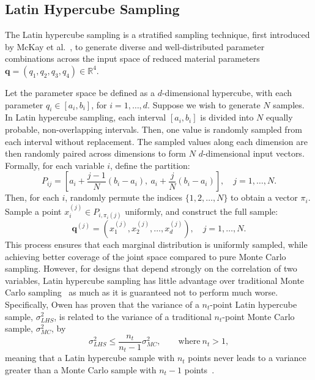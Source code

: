 \documentclass[a4paper,11pt]{article}
\begin{document}
\subsection{Latin Hypercube Sampling}
The Latin hypercube sampling is a stratified sampling technique, first introduced by McKay et al.~\cite{McKay}, to generate diverse and well-distributed parameter combinations across the input space of reduced material parameters $\mathbf{q} = (q_1, q_2, q_3, q_4) \in \mathbb{R}^4$.

Let the parameter space be defined as a $d$-dimensional hypercube, with each parameter \( q_i \in [a_i, b_i] \), for \( i = 1, \ldots, d \). Suppose we wish to generate \( N \) samples. In Latin hypercube sampling, each interval \([a_i, b_i]\) is divided into \( N \) equally probable, non-overlapping intervals. Then, one value is randomly sampled from each interval without replacement. The sampled values along each dimension are then randomly paired across dimensions to form \( N \) $d$-dimensional input vectors. Formally, for each variable \( i \), define the partition:
\begin{equation}
P_{ij} = \left[ a_i + \frac{j-1}{N}(b_i - a_i),\ a_i + \frac{j}{N}(b_i - a_i) \right], \quad j = 1, \dots, N.
\end{equation}
Then, for each \( i \), randomly permute the indices \( \{1, 2, \dots, N\} \) to obtain a vector \( \pi_i \). Sample a point \( x_i^{(j)} \in P_{i,\pi_i(j)} \) uniformly, and construct the full sample:
\begin{equation}
\mathbf{q}^{(j)} = \left( x_1^{(j)}, x_2^{(j)}, \dots, x_d^{(j)} \right), \quad j = 1, \dots, N.
\end{equation}
This process ensures that each marginal distribution is uniformly sampled, while achieving better coverage of the joint space compared to pure Monte Carlo sampling. However, for designs that depend strongly on the correlation of two variables, Latin hypercube sampling has little advantage over traditional Monte Carlo sampling~\cite{press1992} as much as it is guaranteed not to perform much worse. Specifically, Owen has proven that the variance of a $n_t$-point Latin hypercube sample, $\sigma^2_{LHS}$, is related to the variance of a traditional $n_t$-point Monte Carlo sample, $\sigma^2_{MC}$, by
\begin{equation}
	\sigma^2_{LHS} \leq \frac{n_t}{n_t -1}\sigma^2_{MC}, \qquad \text{where}\: n_t > 1,
	\label{eq:vlhs_vmc}  
\end{equation}
meaning that a Latin hypercube sample with $n_t$ points never leads to a variance greater than a Monte Carlo sample with $n_t-1$ points~\cite{owen1997monte}.
\end{document}
